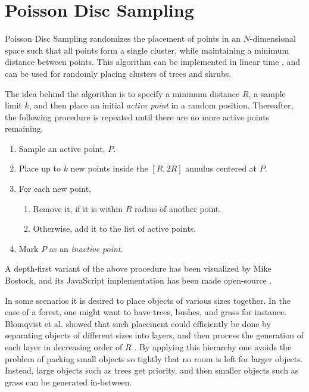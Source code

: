 \section{Poisson Disc Sampling}

Poisson Disc Sampling randomizes the placement of points in an $N$-dimensional space such that all points form a single cluster, while maintaining a minimum distance between points.
This algorithm can be implemented in linear time \cite{poisson_fast}, and can be used for randomly placing clusters of trees and shrubs.


The idea behind the algorithm is to specify a minimum distance $R$, a sample limit $k$, and then place an initial \textit{active point} in a random position.
Thereafter, the following procedure is repeated until there are no more active points remaining.
\begin{enumerate}
  \item Sample an active point, $P$.
  \item Place up to $k$ new points inside the $[R, 2R]$ annulus centered at $P$.
  \item For each new point,
  \begin{enumerate}
    \item Remove it, if it is within $R$ radius of another point.
    \item Otherwise, add it to the list of active points.
  \end{enumerate}
  \item Mark $P$ as an \textit{inactive point}.
\end{enumerate}

A depth-first variant of the above procedure has been visualized by Mike Bostock, and its JavaScript implementation has been made open-source \cite{poisson_demo}.

In some scenarios it is desired to place objects of various sizes together.
In the case of a forest, one might want to have trees, bushes, and grass for instance.
Blomqvist et al. showed that such placement could efficiently be done by separating objects of different sizes into layers, and then process the generation of each layer in decreasing order of $R$ \cite[p.32]{ba_landscape}.
By applying this hierarchy one avoids the problem of packing small objects so tightly that no room is left for larger objects.
Instead, large objects such as trees get priority, and then smaller objects such as grass can be generated in-between.